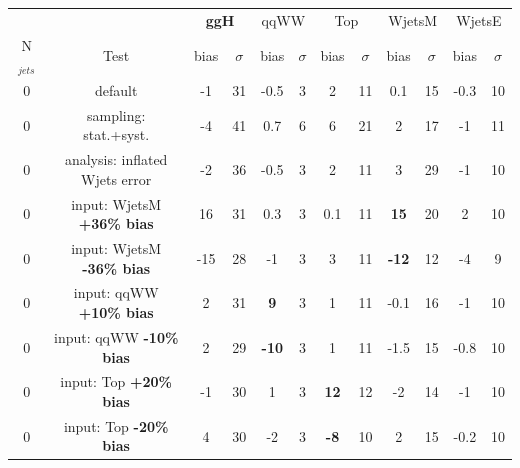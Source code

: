 \begin{table}
\begin{center}
\begin{tabular}{c | c  | c c | c c | c c | c c | c c }
\hline
\hline
          &      & \multicolumn{2}{c|}{{\bf ggH}} & \multicolumn{2}{c|}{qqWW} & \multicolumn{2}{c|}{Top} & \multicolumn{2}{c}{WjetsM} & \multicolumn{2}{c}{WjetsE} \\ 
N$_{jets}$ & Test & bias & $\sigma$ & bias & $\sigma$ & bias & $\sigma$ & bias & $\sigma$ & bias & $\sigma$ \\
\hline
0 & default                             &  -1 & 31 &-0.5 & 3 &  2  & 11 & 0.1 & 15 &-0.3 & 10 \\
0 & sampling: stat.+syst.               &  -4 & 41 & 0.7 & 6 &  6  & 21 &  2  & 17 & -1  & 11 \\
\hline
0 & analysis: inflated Wjets error      &  -2 & 36 & -0.5 & 3 &  2  & 11 &  3        & 29 & -1   & 10 \\
0 & input: WjetsM {\bf +36\% bias}      &  16 & 31 & 0.3  & 3 & 0.1 & 11 & {\bf 15}  & 20 & 2    & 10 \\
0 & input: WjetsM {\bf -36\% bias}      & -15 & 28 & -1   & 3 & 3   & 11 & {\bf -12} & 12 & -4   & 9 \\
\hline
0 & input: qqWW {\bf +10\% bias}        & 2 & 31 & {\bf 9}   & 3 & 1 & 11 & -0.1 & 16 & -1   & 10 \\
0 & input: qqWW {\bf -10\% bias}        & 2 & 29 & {\bf -10} & 3 & 1 & 11 & -1.5 & 15 & -0.8 & 10 \\
\hline
0 & input: Top {\bf +20\% bias}         & -1  & 30  & 1    & 3 & {\bf 12} & 12  & -2 & 14  & -1   & 10\\
0 & input: Top {\bf -20\% bias}         & 4   & 30  & -2   & 3 & {\bf -8} & 10  & 2  & 15  & -0.2 & 10\\

\end{tabular}
\end{center}
\end{table}
